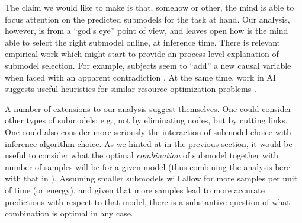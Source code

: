 \documentclass[10pt,letterpaper]{article}
\begin{document}
The claim we would like to make is that, somehow or other, the mind is able to focus attention on the predicted submodels for the task at hand. 
Our analysis, however, is from a ``god's eye'' point of view, and leaves open how is the mind able to select the right submodel online, at inference time.
%
There is relevant empirical work which might start to provide an process-level explanation of submodel selection. For example, subjects seem to ``add'' a new causal variable when faced with an apparent contradiction \cite{Park}.
At the same time, work in AI suggests useful heuristics for similar resource optimization problems \cite[e.g.][]{WickMcCallum}.


A number of extensions to our analysis suggest themselves. 
One could consider other types of submodels: e.g., not by eliminating nodes, but by cutting links.
One could also consider more seriously the interaction of submodel choice with inference algorithm choice. 
As we hinted at in the previous section, it would be useful to consider what the optimal \emph{combination} of submodel together with number of samples will be for a given model (thus combining the analysis here with that in \citealt{Vul2014}). Assuming smaller submodels will allow for more samples per unit of time (or energy), and given that more samples lead to more accurate predictions with respect to that model, there is a substantive question of what combination is optimal in any case.
\end{document}
